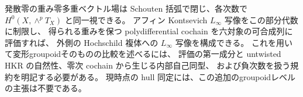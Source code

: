 発散零の重み零多重ベクトル場は Schouten 括弧で閉じ、各次数で
$H^0(X,\wedge^pT_X)$ と同一視できる。
アフィン Kontsevich $L_\infty$ 写像をこの部分代数に制限し、
得られる重みを保つ polydifferential cochain を六対象の可合成列に評価すれば、
外側の Hochschild 複体への $L_\infty$ 写像を構成できる。
これを用いて変形groupoidそのものの比較を述べるには、
評価の第一成分と untwisted HKR の自然性、零次 cochain から生じる内部自己同型、
および負次数を扱う規約を明記する必要がある。
現時点の hull 同定には、この追加のgroupoidレベルの主張は不要である。

